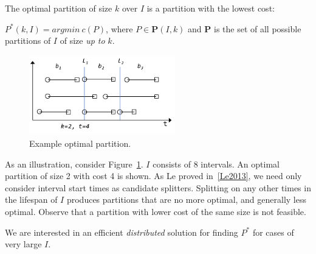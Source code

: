 The optimal partition of size $k$ over $I$ is a partition with the
lowest cost:

$P^*(k,I) = argmin~ c(P)$, where $P \in \mathbf{P}(I,k)$ and
$\mathbf{P}$ is the set of all possible partitions of $I$ of size {\em
  up to} $k$.

\begin{figure}
\centering
\includegraphics[width=2.5in]{figs/buckets.pdf}
\caption{Example optimal partition.}
\label{fig:example}
\end{figure}

As an illustration, consider Figure~\ref{fig:example}.  $I$ consists
of 8 intervals. An optimal partition of size 2 with cost 4 is shown.
As Le proved in~\ref{Le2013}, we need only consider interval start
times as candidate splitters.  Splitting on any other times in the
lifespan of $I$ produces partitions that are no more optimal, and
generally less optimal.  Observe that a partition with lower cost of
the same size is not feasible.

We are interested in an efficient {\em distributed} solution for
finding $P^*$ for cases of very large $I$.
